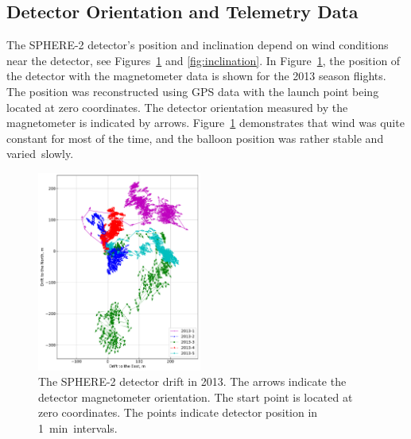 \documentclass[universe,article,accept,moreauthors,pdftex]{Definitions/mdpi}
\begin{document}
\subsection{Detector Orientation and Telemetry Data}
\label{sect:telemetrydata}

The \mbox{SPHERE-2} detector's position and inclination depend on wind conditions near the detector, see Figures~\ref{fig:gps_compass} and \ref{fig:inclination}. In Figure~\ref{fig:gps_compass}, the position of the detector with the magnetometer data is shown for the 2013 season flights. The position was reconstructed using GPS data with the launch point being located at zero coordinates. The detector orientation measured by the magnetometer is indicated by arrows. Figure~\ref{fig:gps_compass} demonstrates that wind was quite constant for most of the time, and the balloon position was rather stable and varied~slowly.  
\begin{figure}[H]
    \includegraphics[width=0.48\textwidth]{figs/fig4_GPS_drift.pdf}\hspace{2pc}%
    \caption{The SPHERE-2 detector drift in 2013. The arrows indicate the detector magnetometer orientation. The start point is located at zero coordinates. The points indicate detector position in 1~min~intervals.}
\label{fig:gps_compass}
\end{figure}
\end{document}
